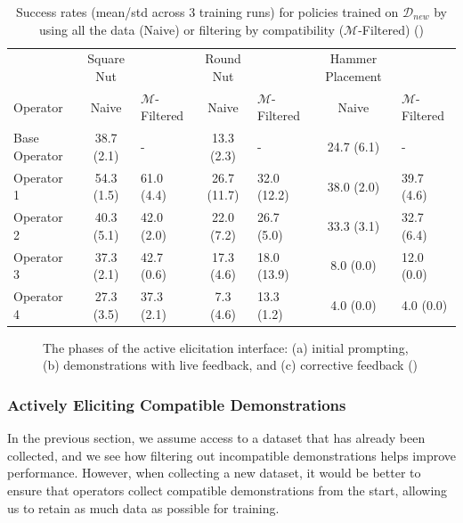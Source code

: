 \documentclass[
  letterpaper,
  numbers=noenddot,
  DIV=11]{scrreprt}
\theoremstyle{plain}
\theoremstyle{definition}
\theoremstyle{remark}
\begin{document}
\begin{longtable}[]{@{}lclclcl@{}}
\caption{Success rates (mean/std across 3 training runs) for policies
trained on \(\mathcal{D}_{new}\) by using all the data (Naive) or
filtering by compatibility (\(\mathcal{M}\)-Filtered)
()}\label{tbl-m_filter_table}\tabularnewline
\toprule\noalign{}
\endfirsthead
\endhead
\bottomrule\noalign{}
\endlastfoot
& Square Nut & & Round Nut & & Hammer Placement & \\
Operator & Naive & \(\mathcal{M}\)-Filtered & Naive &
\(\mathcal{M}\)-Filtered & Naive & \(\mathcal{M}\)-Filtered \\
Base Operator & 38.7 (2.1) & - & 13.3 (2.3) & - & 24.7 (6.1) & - \\
Operator 1 & 54.3 (1.5) & 61.0 (4.4) & 26.7 (11.7) & 32.0 (12.2) & 38.0
(2.0) & 39.7 (4.6) \\
Operator 2 & 40.3 (5.1) & 42.0 (2.0) & 22.0 (7.2) & 26.7 (5.0) & 33.3
(3.1) & 32.7 (6.4) \\
Operator 3 & 37.3 (2.1) & 42.7 (0.6) & 17.3 (4.6) & 18.0 (13.9) & 8.0
(0.0) & 12.0 (0.0) \\
Operator 4 & 27.3 (3.5) & 37.3 (2.1) & 7.3 (4.6) & 13.3 (1.2) & 4.0
(0.0) & 4.0 (0.0) \\
\end{longtable}

\begin{figure}


\caption{\label{fig-active_elicitation}The phases of the active
elicitation interface: (a) initial prompting, (b) demonstrations with
live feedback, and (c) corrective feedback
()}

\end{figure}%

\subsubsection{Actively Eliciting Compatible
Demonstrations}\label{actively-eliciting-compatible-demonstrations}

In the previous section, we assume access to a dataset that has already
been collected, and we see how filtering out incompatible demonstrations
helps improve performance. However, when collecting a new dataset, it
would be better to ensure that operators collect compatible
demonstrations from the start, allowing us to retain as much data as
possible for training.
\end{document}
